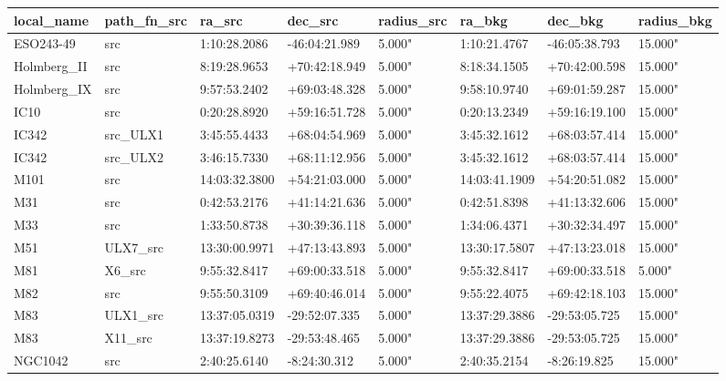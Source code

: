 \begin{tabular}{llllllll}
\toprule
        local\_name & path\_fn\_src &        ra\_src &       dec\_src & radius\_src &        ra\_bkg &       dec\_bkg & radius\_bkg \\
\midrule
         ESO243-49 &         src &  1:10:28.2086 & -46:04:21.989 &     5.000" &  1:10:21.4767 & -46:05:38.793 &    15.000" \\
       Holmberg\_II &         src &  8:19:28.9653 & +70:42:18.949 &     5.000" &  8:18:34.1505 & +70:42:00.598 &    15.000" \\
       Holmberg\_IX &         src &  9:57:53.2402 & +69:03:48.328 &     5.000" &  9:58:10.9740 & +69:01:59.287 &    15.000" \\
              IC10 &         src &  0:20:28.8920 & +59:16:51.728 &     5.000" &  0:20:13.2349 & +59:16:19.100 &    15.000" \\
             IC342 &    src\_ULX1 &  3:45:55.4433 & +68:04:54.969 &     5.000" &  3:45:32.1612 & +68:03:57.414 &    15.000" \\
             IC342 &    src\_ULX2 &  3:46:15.7330 & +68:11:12.956 &     5.000" &  3:45:32.1612 & +68:03:57.414 &    15.000" \\
              M101 &         src & 14:03:32.3800 & +54:21:03.000 &     5.000" & 14:03:41.1909 & +54:20:51.082 &    15.000" \\
               M31 &         src &  0:42:53.2176 & +41:14:21.636 &     5.000" &  0:42:51.8398 & +41:13:32.606 &    15.000" \\
               M33 &         src &  1:33:50.8738 & +30:39:36.118 &     5.000" &  1:34:06.4371 & +30:32:34.497 &    15.000" \\
               M51 &    ULX7\_src & 13:30:00.9971 & +47:13:43.893 &     5.000" & 13:30:17.5807 & +47:13:23.018 &    15.000" \\
               M81 &      X6\_src &  9:55:32.8417 & +69:00:33.518 &     5.000" &  9:55:32.8417 & +69:00:33.518 &     5.000" \\
               M82 &         src &  9:55:50.3109 & +69:40:46.014 &     5.000" &  9:55:22.4075 & +69:42:18.103 &    15.000" \\
               M83 &    ULX1\_src & 13:37:05.0319 & -29:52:07.335 &     5.000" & 13:37:29.3886 & -29:53:05.725 &    15.000" \\
               M83 &     X11\_src & 13:37:19.8273 & -29:53:48.465 &     5.000" & 13:37:29.3886 & -29:53:05.725 &    15.000" \\
           NGC1042 &         src &  2:40:25.6140 &  -8:24:30.312 &     5.000" &  2:40:35.2154 &  -8:26:19.825 &    15.000" \\

\end{tabular}
